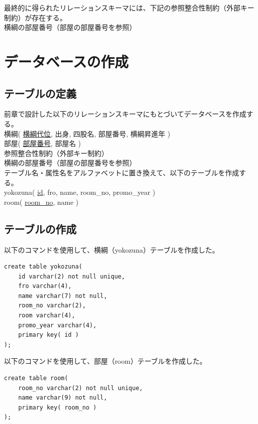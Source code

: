 \documentclass[10pt,a4paper,titlepage]{jreport}
\begin{document}
最終的に得られたリレーションスキーマには、下記の参照整合性制約（外部キー制約）が存在する。\\

横綱の部屋番号（部屋の部屋番号を参照）

\chapter{データベースの作成}

\section{テーブルの定義}
前章で設計した以下のリレーションスキーマにもとづいてデータベースを作成する。\\

横綱( \underline{横綱代位}, 出身, 四股名, 部屋番号, 横綱昇進年 )\\
部屋( \underline{部屋番号}, 部屋名 )\\

参照整合性制約（外部キー制約）\\
横綱の部屋番号（部屋の部屋番号を参照）
\\

テーブル名・属性名をアルファベットに置き換えて、以下のテーブルを作成する。\\

yokozuna( \underline{id}, fro, name, room\_no, promo\_year )\\
room( \underline{room\_no}, name )\\


\section{テーブルの作成}
以下のコマンドを使用して、横綱（yokozuna）テーブルを作成した。

\begin{lstlisting}[caption=横綱テーブルの作成のコマンド]
create table yokozuna(
	id varchar(2) not null unique,
	fro varchar(4),
	name varchar(7) not null,
	room_no varchar(2),
	room varchar(4),
	promo_year varchar(4), 
	primary key( id )
);
\end{lstlisting}
\vspace{3mm}

以下のコマンドを使用して、部屋（room）テーブルを作成した。

\begin{lstlisting}[caption=部屋テーブルの作成のコマンド]
create table room(
	room_no varchar(2) not null unique,
	name varchar(9) not null,
	primary key( room_no )
);
\end{lstlisting}
\vspace{3mm}
\end{document}
